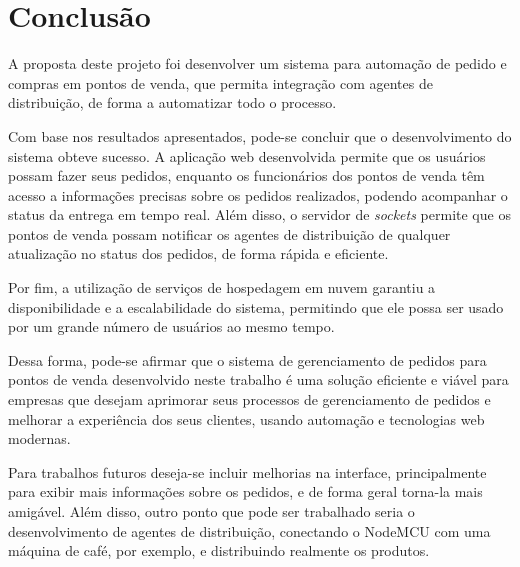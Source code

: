 \chapter{Conclusão}\label{cap:conclusao}

A proposta deste projeto foi desenvolver um sistema para automação de pedido e compras em pontos de venda, que permita integração com agentes de distribuição, de forma a automatizar todo o processo.

Com base nos resultados apresentados, pode-se concluir que o desenvolvimento do sistema obteve sucesso. A aplicação web desenvolvida permite que os usuários possam fazer seus pedidos, enquanto os funcionários dos pontos de venda têm acesso a informações precisas sobre os pedidos realizados, podendo acompanhar o status da entrega em tempo real. Além disso, o servidor de \textit{sockets} permite que os pontos de venda possam notificar os agentes de distribuição de qualquer atualização no status dos pedidos, de forma rápida e eficiente.

Por fim, a utilização de serviços de hospedagem em nuvem garantiu a disponibilidade e a escalabilidade do sistema, permitindo que ele possa ser usado por um grande número de usuários ao mesmo tempo.

Dessa forma, pode-se afirmar que o sistema de gerenciamento de pedidos para pontos de venda desenvolvido neste trabalho é uma solução eficiente e viável para empresas que desejam aprimorar seus processos de gerenciamento de pedidos e melhorar a experiência dos seus clientes, usando automação e tecnologias web modernas.

Para trabalhos futuros deseja-se incluir melhorias na interface, principalmente para exibir mais informações sobre os pedidos, e de forma geral torna-la mais amigável. Além disso, outro ponto que pode ser trabalhado seria o desenvolvimento de agentes de distribuição, conectando o NodeMCU com uma máquina de café, por exemplo, e distribuindo realmente os produtos.